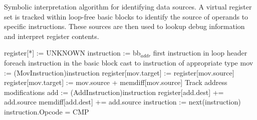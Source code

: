 
\begin{algorithm}
  \caption{Symbolic interpretation algorithm for identifying data sources.  A
  virtual register set is tracked within loop-free basic blocks to identify
  the source of operands to specific instructions.  These sources are then
  used to lookup debug information and interpret register contents.}
  \label{alg:sinterp}
  \begin{algorithmic}[1]
    \State register[*] := UNKNOWN
    \State instruction := bb$_{addr}$ \Comment first instruction in loop header
    \Repeat \Comment foreach instruction in the basic block
      \State \Comment cast to instruction of appropriate type
        \State mov := (MovInstruction)instruction
          \State register[mov.target] := register[mov.source]
          \State register[mov.target] := mov.source +
                                         memdiff[mov.source]
        \EndIf
      \EndIf
       \Comment Track address modifications
        \State add := (AddInstruction)instruction
          \State register[add.dest] += add.source
        \EndIf
          \State memdiff[add.dest] += add.source
        \EndIf
      \EndIf
      \State instruction := next(instruction)
    \Until instruction.Opcode = CMP
  \end{algorithmic}
\end{algorithm}

